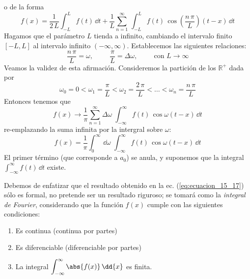 o de la forma
\begin{equation}
f(x) = \dfrac{1}{2 \, L} \int_{-L}^{L} f(t) \, \dd{t} + \dfrac{1}{L} \sum_{n=1}^{\infty} \, \int_{-L}^{L} f(t) \, \cos \left( \dfrac{n \, \pi}{L} \right) (t - x) \, \dd{t}
\label{eq:ecuacion_15_15}
\end{equation}
Hagamos que el parámetro $L$ tienda a infinito, cambiando el intervalo finito $[-L, L]$ al intervalo infinito $(-\infty, \infty)$. Establecemos las siguientes relaciones:
\[ \dfrac{n \, \pi}{L} = \omega, \hspace{1cm} \dfrac{\pi}{L} = \Delta \omega, \hspace{1cm} \mbox{con } L \to \infty \]
Veamos la validez de esta afirmación. Consideremos la partición de los $\mathbb{R}^{+}$ dada por
\begin{equation}
\omega_{0} = 0 < \omega_{1} = \dfrac{\pi}{L} < \omega_{2} = \dfrac{2 \, \pi}{L} < \ldots < \omega_{n} = \dfrac{n \, \pi}{L}
\label{eq:ecuacion_08_16}
\end{equation}
Entonces tenemos que
\begin{equation}
f(x) \rightarrow \dfrac{1}{\pi} \sum_{n=1}^{\infty} \Delta \omega \; \int_{-\infty}^{\infty} f(t) \, \cos \omega (t - x) \, \dd{t}
\label{eq:ecuacion_15_16}
\end{equation}
re-emplazando la suma infinita por la intergral sobre $\omega$:
\begin{equation}
f(x) = \dfrac{1}{\pi} \int_{0}^{\infty} \, \dd \omega \; \int_{-\infty}^{\infty} f(t) \, \cos \omega (t - x) \, \dd{t}
\label{eq:ecuacion_15_17}
\end{equation}
 El primer término (que corresponde a $a_{0}$) se anula, y suponemos que la integral $\displaystyle{\int_{-\infty}^{\infty} f(t) \, \dd{t}}$ existe.
\par
Debemos de enfatizar que el resultado obtenido en la ec. (\ref{eq:ecuacion_15_17}) sólo es formal, no pretende ser un resultado riguroso; se tomará como la \emph{integral de Fourier}, considerando que la función $f(x)$ cumple con las siguientes condiciones:
\begin{enumerate}
\item Es continua (continua por partes)
\item Es diferenciable (diferenciable por partes)
\item La integral $\displaystyle{\int_{-\infty}^{\infty} \abs{f(x)} \, \dd{x}}$ es finita. 
\end{enumerate}
